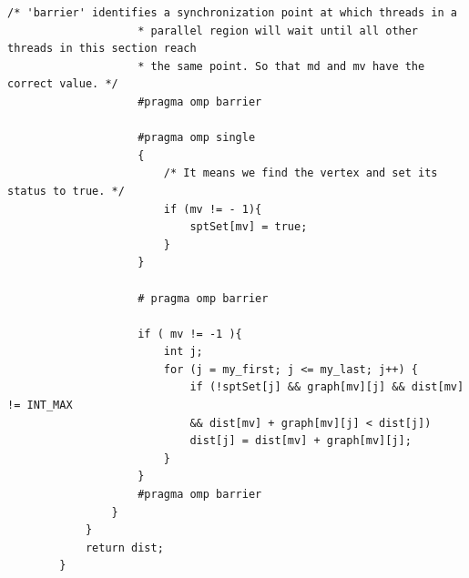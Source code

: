 \begin{lstlisting}[caption={OpenMP Parallel algorithm for computing SSSP\cite{he2021parallelizing}}, label={listing:ls_sssp_omp}]
					/* 'barrier' identifies a synchronization point at which threads in a 
					* parallel region will wait until all other threads in this section reach 
					* the same point. So that md and mv have the correct value. */
					#pragma omp barrier
					
					#pragma omp single
					{
						/* It means we find the vertex and set its status to true. */
						if (mv != - 1){
							sptSet[mv] = true;
						}
					}
					
					# pragma omp barrier
					
					if ( mv != -1 ){
						int j;
						for (j = my_first; j <= my_last; j++) {
							if (!sptSet[j] && graph[mv][j] && dist[mv] != INT_MAX
							&& dist[mv] + graph[mv][j] < dist[j])
							dist[j] = dist[mv] + graph[mv][j];
						}
					}
					#pragma omp barrier
				}
			}
			return dist;
		}
	\end{lstlisting}
	
